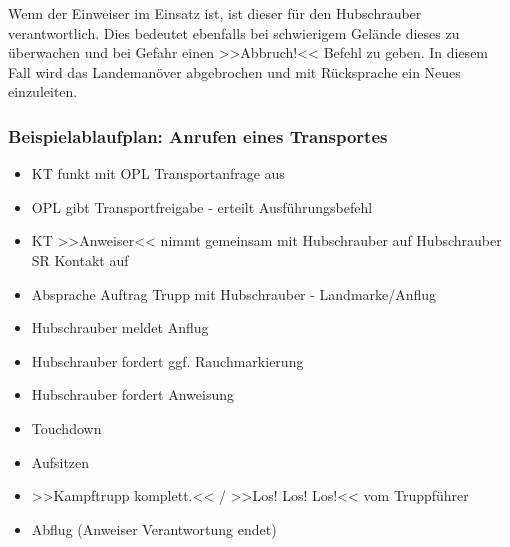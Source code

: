 	Wenn der Einweiser im Einsatz ist, ist dieser für den Hubschrauber verantwortlich. Dies bedeutet ebenfalls bei schwierigem Gelände dieses zu überwachen und bei Gefahr einen >>Abbruch!<< Befehl zu geben. In diesem Fall wird das Landemanöver abgebrochen und mit Rücksprache ein Neues einzuleiten.

\subsubsection{Beispielablaufplan: Anrufen eines Transportes}
	\begin{itemize}
		\item \ac{KT} funkt mit OPL Transportanfrage aus

    		\item \ac{OPL} gibt Transportfreigabe - erteilt Ausführungsbefehl

    		\item KT >>Anweiser<< nimmt gemeinsam mit Hubschrauber auf Hubschrauber \ac{SR} Kontakt auf

    		\item Absprache Auftrag Trupp mit Hubschrauber - Landmarke/Anflug

		\item  Hubschrauber meldet Anflug

    		\item Hubschrauber fordert ggf. Rauchmarkierung

    		\item Hubschrauber fordert Anweisung

    		\item Touchdown

    		\item Aufsitzen

    		\item >>Kampftrupp komplett.<< / >>Los! Los! Los!<< vom Truppführer

    		\item Abflug (Anweiser Verantwortung endet)
	\end{itemize}
